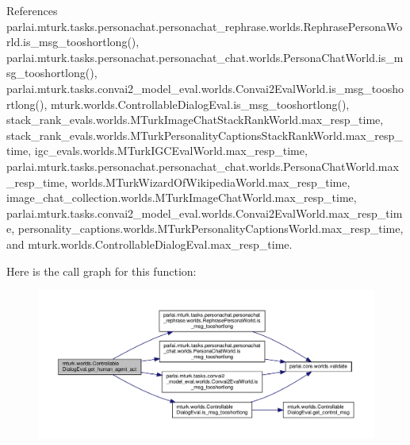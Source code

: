 References parlai.\+mturk.\+tasks.\+personachat.\+personachat\+\_\+rephrase.\+worlds.\+Rephrase\+Persona\+World.\+is\+\_\+msg\+\_\+tooshortlong(), parlai.\+mturk.\+tasks.\+personachat.\+personachat\+\_\+chat.\+worlds.\+Persona\+Chat\+World.\+is\+\_\+msg\+\_\+tooshortlong(), parlai.\+mturk.\+tasks.\+convai2\+\_\+model\+\_\+eval.\+worlds.\+Convai2\+Eval\+World.\+is\+\_\+msg\+\_\+tooshortlong(), mturk.\+worlds.\+Controllable\+Dialog\+Eval.\+is\+\_\+msg\+\_\+tooshortlong(), stack\+\_\+rank\+\_\+evals.\+worlds.\+M\+Turk\+Image\+Chat\+Stack\+Rank\+World.\+max\+\_\+resp\+\_\+time, stack\+\_\+rank\+\_\+evals.\+worlds.\+M\+Turk\+Personality\+Captions\+Stack\+Rank\+World.\+max\+\_\+resp\+\_\+time, igc\+\_\+evals.\+worlds.\+M\+Turk\+I\+G\+C\+Eval\+World.\+max\+\_\+resp\+\_\+time, parlai.\+mturk.\+tasks.\+personachat.\+personachat\+\_\+chat.\+worlds.\+Persona\+Chat\+World.\+max\+\_\+resp\+\_\+time, worlds.\+M\+Turk\+Wizard\+Of\+Wikipedia\+World.\+max\+\_\+resp\+\_\+time, image\+\_\+chat\+\_\+collection.\+worlds.\+M\+Turk\+Image\+Chat\+World.\+max\+\_\+resp\+\_\+time, parlai.\+mturk.\+tasks.\+convai2\+\_\+model\+\_\+eval.\+worlds.\+Convai2\+Eval\+World.\+max\+\_\+resp\+\_\+time, personality\+\_\+captions.\+worlds.\+M\+Turk\+Personality\+Captions\+World.\+max\+\_\+resp\+\_\+time, and mturk.\+worlds.\+Controllable\+Dialog\+Eval.\+max\+\_\+resp\+\_\+time.

Here is the call graph for this function\+:
\nopagebreak
\begin{figure}[H]
\begin{center}
\leavevmode
\includegraphics[width=350pt]{classmturk_1_1worlds_1_1ControllableDialogEval_af81be6365b8b4be98cb300aa51f1de9c_cgraph}
\end{center}
\end{figure}
\mbox{\label{classmturk_1_1worlds_1_1ControllableDialogEval_a8792ad92033ef69bb203d7a3574f4343}} 
